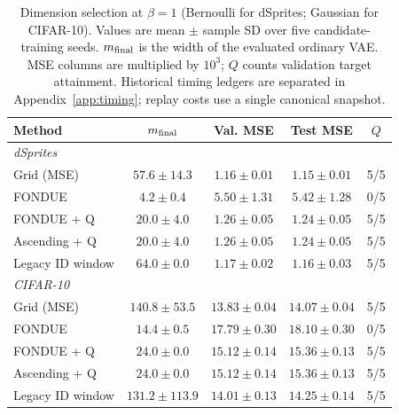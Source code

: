 \begin{table}[H]
\caption{Dimension selection at $\beta=1$ (Bernoulli for dSprites; Gaussian for CIFAR-10). Values are mean $\pm$ sample SD over five candidate-training seeds. $m_{\rm final}$ is the width of the evaluated ordinary VAE. MSE columns are multiplied by $10^3$; $Q$ counts validation target attainment. Historical timing ledgers are separated in Appendix~\ref{app:timing}; replay costs use a single canonical snapshot.}\label{tab:main2}
\footnotesize
\setlength{\tabcolsep}{3.5pt}
\begin{tabular*}{\textwidth}{@{\extracolsep{\fill}}lcccc@{}}
\toprule
Method & $m_{\rm final}$ & Val. MSE & Test MSE & $Q$ \\
\midrule
\multicolumn{5}{l}{\emph{dSprites}} \\
Grid (MSE) & $57.6 \pm 14.3$ & $1.16 \pm 0.01$ & $1.15 \pm 0.01$ & 5/5 \\
FONDUE & $4.2 \pm 0.4$ & $5.50 \pm 1.31$ & $5.42 \pm 1.28$ & 0/5 \\
FONDUE + Q & $20.0 \pm 4.0$ & $1.26 \pm 0.05$ & $1.24 \pm 0.05$ & 5/5 \\
Ascending + Q & $20.0 \pm 4.0$ & $1.26 \pm 0.05$ & $1.24 \pm 0.05$ & 5/5 \\
Legacy ID window & $64.0 \pm 0.0$ & $1.17 \pm 0.02$ & $1.16 \pm 0.03$ & 5/5 \\
\midrule
\multicolumn{5}{l}{\emph{CIFAR-10}} \\
Grid (MSE) & $140.8 \pm 53.5$ & $13.83 \pm 0.04$ & $14.07 \pm 0.04$ & 5/5 \\
FONDUE & $14.4 \pm 0.5$ & $17.79 \pm 0.30$ & $18.10 \pm 0.30$ & 0/5 \\
FONDUE + Q & $24.0 \pm 0.0$ & $15.12 \pm 0.14$ & $15.36 \pm 0.13$ & 5/5 \\
Ascending + Q & $24.0 \pm 0.0$ & $15.12 \pm 0.14$ & $15.36 \pm 0.13$ & 5/5 \\
Legacy ID window & $131.2 \pm 113.9$ & $14.01 \pm 0.13$ & $14.25 \pm 0.14$ & 5/5 \\
\bottomrule
\end{tabular*}
\end{table}
